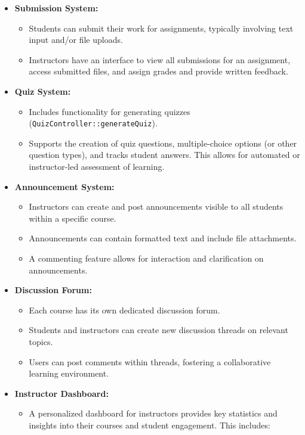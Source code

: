 \begin{itemize}
    \item \textbf{Submission System:}
    \begin{itemize}
        \item Students can submit their work for assignments, typically involving text input and/or file uploads.
        \item Instructors have an interface to view all submissions for an assignment, access submitted files, and assign grades and provide written feedback.
    \end{itemize}
    \item \textbf{Quiz System:}
    \begin{itemize}
        \item Includes functionality for generating quizzes (\texttt{QuizController::generateQuiz}).
        \item Supports the creation of quiz questions, multiple-choice options (or other question types), and tracks student answers. This allows for automated or instructor-led assessment of learning.
    \end{itemize}
    \item \textbf{Announcement System:}
    \begin{itemize}
        \item Instructors can create and post announcements visible to all students within a specific course.
        \item Announcements can contain formatted text and include file attachments.
        \item A commenting feature allows for interaction and clarification on announcements.
    \end{itemize}
    \item \textbf{Discussion Forum:}
    \begin{itemize}
        \item Each course has its own dedicated discussion forum.
        \item Students and instructors can create new discussion threads on relevant topics.
        \item Users can post comments within threads, fostering a collaborative learning environment.
    \end{itemize}
    \item \textbf{Instructor Dashboard:}
    \begin{itemize}
        \item A personalized dashboard for instructors provides key statistics and insights into their courses and student engagement. This includes:

\end{itemize}
\end{itemize}
